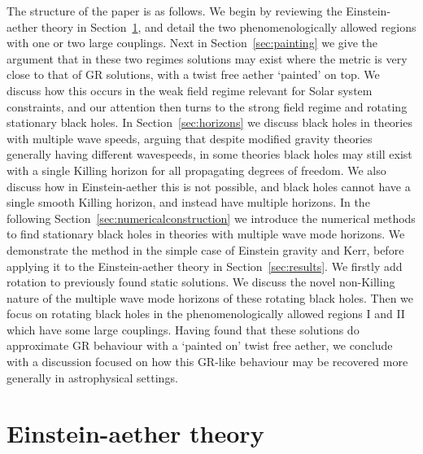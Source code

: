 \documentclass[12pt]{article}
\numberwithin{equation}{section}
\begin{document}
The structure of the paper is as follows. 
%
We begin by reviewing the Einstein-aether theory in Section~\ref{sec:aether}, and detail the two  phenomenologically allowed regions with one or two large couplings. 
%
Next in Section~\ref{sec:painting} we give the argument that in these two regimes solutions may exist where the metric is very close to that of GR solutions, with a twist free aether `painted' on top. We discuss how this occurs in the weak field regime relevant for Solar system constraints, and our attention then turns to the strong field regime and rotating stationary black holes.
%
In Section~\ref{sec:horizons} we discuss black holes in theories with multiple wave speeds, arguing that
despite modified gravity theories generally having different wavespeeds, in some theories black holes may still exist with a single Killing horizon for all propagating degrees of freedom. We also discuss how in Einstein-aether this is not possible, and black holes cannot have a single smooth Killing horizon, and instead  have multiple horizons.
%
In the following Section~\ref{sec:numericalconstruction} we introduce the numerical methods to find stationary black holes in theories with multiple wave mode horizons. 
We demonstrate the method in the simple case of Einstein gravity and Kerr, before applying it to the Einstein-aether theory in Section~\ref{sec:results}. We firstly add rotation to previously found static solutions.
We discuss the novel non-Killing nature of the multiple wave mode horizons of these rotating black holes. Then we focus on rotating black holes in the phenomenologically allowed regions I and II which have some large couplings. 
Having found that these solutions do approximate GR behaviour with a `painted on' twist free aether, we conclude with a discussion focused on how this GR-like behaviour may be recovered more generally in astrophysical settings.




\section{Einstein-aether theory}
\label{sec:aether}
\end{document}
